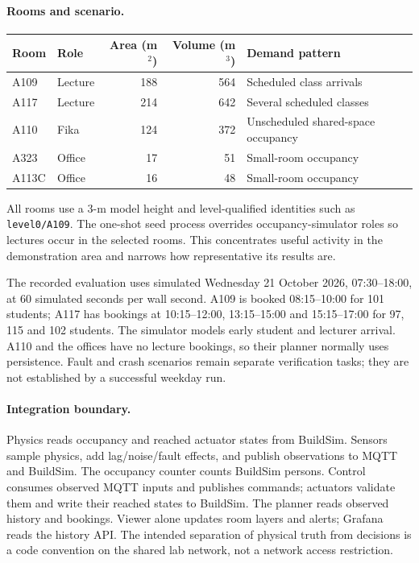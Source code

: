 \documentclass[11pt,a4paper]{article}
\begin{document}
\paragraph{Rooms and scenario.}
\noindent\begin{tabularx}{\linewidth}{llrrX}\toprule Room & Role & Area (m$^2$) & Volume (m$^3$) & Demand pattern\\\midrule
A109 & Lecture & 188 & 564 & Scheduled class arrivals\\
A117 & Lecture & 214 & 642 & Several scheduled classes\\
A110 & Fika & 124 & 372 & Unscheduled shared-space occupancy\\
A323 & Office & 17 & 51 & Small-room occupancy\\
A113C & Office & 16 & 48 & Small-room occupancy\\\bottomrule\end{tabularx}
All rooms use a 3-m model height and level-qualified identities such as \texttt{level0/A109}. The one-shot seed process overrides occupancy-simulator roles so lectures occur in the selected rooms. This concentrates useful activity in the demonstration area and narrows how representative its results are.

The recorded evaluation uses simulated Wednesday 21 October 2026, 07:30--18:00, at 60 simulated seconds per wall second. A109 is booked 08:15--10:00 for 101 students; A117 has bookings at 10:15--12:00, 13:15--15:00 and 15:15--17:00 for 97, 115 and 102 students. The simulator models early student and lecturer arrival. A110 and the offices have no lecture bookings, so their planner normally uses persistence. Fault and crash scenarios remain separate verification tasks; they are not established by a successful weekday run.

\paragraph{Integration boundary.}
Physics reads occupancy and reached actuator states from BuildSim. Sensors sample physics, add lag/noise/fault effects, and publish observations to MQTT and BuildSim. The occupancy counter counts BuildSim persons. Control consumes observed MQTT inputs and publishes commands; actuators validate them and write their reached states to BuildSim. The planner reads observed history and bookings. Viewer alone updates room layers and alerts; Grafana reads the history API. The intended separation of physical truth from decisions is a code convention on the shared lab network, not a network access restriction.
\end{document}
